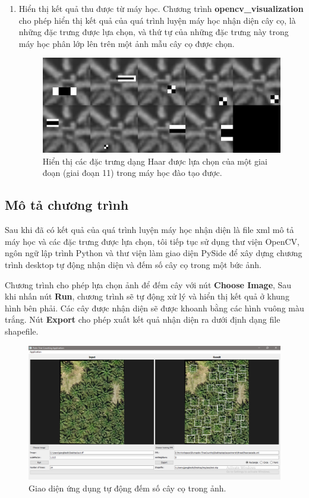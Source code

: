 \documentclass[14pt, oneside, a4paper, openany]{scrartcl}
\begin{document}
\begin{enumerate}
	\item Hiển thị kết quả thu được từ máy học. Chương trình \textbf{opencv\_visualization} cho phép hiển thị kết quả của quá trình luyện máy học nhận diện cây cọ, là những đặc trưng được lựa chọn, và thứ tự của những đặc trưng này trong máy học phân lớp lên trên một ảnh mẫu cây cọ được chọn.
\begin{figure}[!h]
	\centering
	\includegraphics[scale=0.3]{figures/datastage_11.png} 
	\caption[Hiển thị các đặc trưng dạng Haar được lựa chọn của một giai đoạn trong máy học]{Hiển thị các đặc trưng dạng Haar được lựa chọn của một giai đoạn (giai đoạn 11) trong máy học đào tạo được.}
\end{figure}	
\end{enumerate}

\subsection{Mô tả chương trình}
Sau khi đã có kết quả của quá trình luyện máy học nhận diện là file xml mô tả máy học và các đặc trưng được lựa chọn, tôi tiếp tục sử dụng thư viện OpenCV, ngôn ngữ lập trình Python và thư viện làm giao diện PySide để xây dựng chương trình desktop tự động nhận diện và đếm số cây cọ trong một bức ảnh.

Chương trình cho phép lựa chọn ảnh để đếm cây với nút \textbf{Choose Image}, Sau khi nhấn nút \textbf{Run}, chương trình sẽ tự động xử lý và hiển thị kết quả ở khung hình bên phải. Các cây được nhận diện sẽ được khoanh bằng các hình vuông màu trắng.
Nút \textbf{Export} cho phép xuất kết quả nhận diện ra dưới định dạng file shapefile.
\begin{figure}[!h]
	\centering
	\includegraphics[scale=0.45]{figures/appScreenshot01.png}
	\caption[Giao diện ứng dụng tự động đếm số cây cọ trong ảnh]{Giao diện ứng dụng tự động đếm số cây cọ trong ảnh.}
\end{figure}
\end{document}
